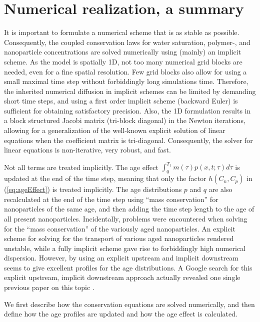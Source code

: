 \section{Numerical realization, a summary}
It is important to formulate a numerical scheme that is as stable as possible. Consequently, the coupled conservation laws for water saturation, polymer-, and nanoparticle concentrations are solved numerically using (mainly) an implicit scheme. As the model is spatially 1D, not too many numerical grid blocks are needed, even for a fine spatial resolution. Few grid blocks also allow for using a small maximal time step without forbiddingly long simulations time. Therefore, the inherited numerical diffusion in implicit schemes can be limited by demanding short time steps, and using a first order implicit scheme (backward Euler) is sufficient for obtaining satisfactory precision. Also, the 1D formulation results in a block structured Jacobi matrix (tri-block diagonal) in the Newton iterations, allowing for a generalization of the well-known explicit solution of linear equations when the coefficient matrix is tri-diagonal. Consequently, the solver for linear equations is non-iterative, very robust, and fast. 

Not all terms are treated implicitly. The age effect $\int^{T_1}_{0}m(\tau)p(x,t;\tau)d\tau$ is updated at the end of the time step, meaning that only the factor $h(C_n,C_p)$ in (\ref{eq:ageEffect}) is treated implicitly. The age distributions $p$ and $q$ are also recalculated at the end of the time step using “mass conservation” for nanoparticles of the same age, and then adding the time step length to the age of all present nanoparticles. Incidentally, problems were encountered when solving for the “mass conservation” of the variously aged nanoparticles.  An explicit scheme for solving for the transport of various aged nanoparticles rendered unstable, while a fully implicit scheme gave rise to forbiddingly high numerical dispersion. However, by using an explicit upstream and implicit downstream seems to give excellent profiles for the age distributions. A Google search for this explicit upstream, implicit downstream approach actually revealed one single previous paper on this topic \citep{Flatten2008}. 

We first describe how the conservation equations are solved numerically, and then define how the age profiles are updated and how the age effect is calculated.

